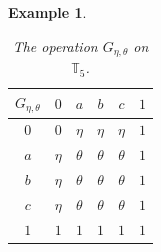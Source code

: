 \documentclass[preprint,12pt]{elsarticle}
\newtheorem{example}[theorem]{Example}
\begin{document}
\begin{example}
\begin{table}[ht]
\centering
\caption{The operation $G_{\eta,\theta}$ on $\mathbb{T}_5$.}
\label{tab:Geta}
\begin{tabular}{c|ccccc}
$G_{\eta,\theta}$&$0$&$a$&$b$&$c$&$1$\\\hline
$0$&$0$&$\eta$&$\eta$&$\eta$&$1$\\
$a$&$\eta$&$\theta$&$\theta$&$\theta$&$1$\\
$b$&$\eta$&$\theta$&$\theta$&$\theta$&$1$\\
$c$&$\eta$&$\theta$&$\theta$&$\theta$&$1$\\
$1$&$1$&$1$&$1$&$1$&$1$\\
\end{tabular}
\end{table}
\end{example}
\end{document}
